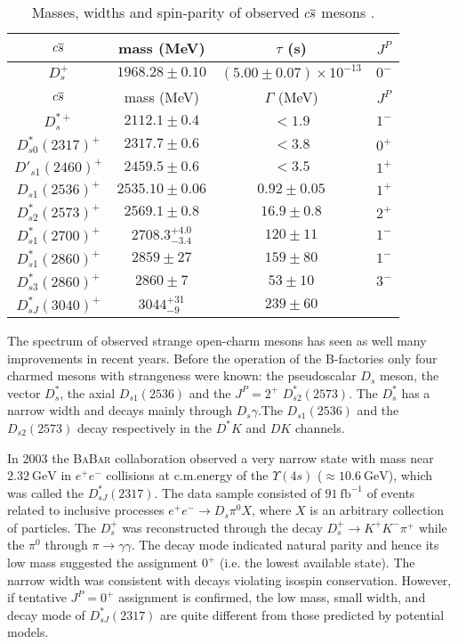 \begin{table}
  \centering
  \begin{tabular}{c c c c}
    \toprule
    $c \overline{s}$ & mass (MeV) & $\tau$ (s) & $J^P$ \\ 
    \midrule
    $D^+_s$ & $1968.28 \pm 0.10$ & $\left( 5.00 \pm 0.07 \right) \times 10^{-13}$ & $0^-$ \\
    \midrule[\heavyrulewidth]
    $c \overline{s}$ & mass (MeV) & $\Gamma$ (MeV) & $J^P$ \\ 
    \midrule
    $D^{* +}_s$ & $2112.1 \pm 0.4$ & $< 1.9$ & $1^-$ \\
    $D^*_{s0}(2317)^+$ & $2317.7 \pm 0.6$ & $<3.8$ & $0^+$ \\
    $D'_{s1}(2460)^+$ & $2459.5 \pm 0.6$ & $<3.5$ & $1^+$ \\
    $D_{s1}(2536)^+$ & $2535.10 \pm 0.06$ & $0.92 \pm 0.05$ & $1^+$ \\
    $D^*_{s2}(2573)^+$ & $2569.1 \pm 0.8$ & $16.9 \pm 0.8$ & $2^+$ \\
    $D^*_{s1}(2700)^+$ & $2708.3^{+4.0}_{-3.4}$ & $120 \pm 11$ & $1^-$ \\
    $D^*_{s1}(2860)^+$ & $2859 \pm 27$ & $159 \pm 80$ & $1^-$ \\
    $D^*_{s3}(2860)^+$ & $2860 \pm 7$ & $53 \pm 10$ & $3^-$ \\
    $D^*_{sJ}(3040)^+$ & $3044^{+31}_{-9}$ & $239 \pm 60$ & \\
    \bottomrule
  \end{tabular}
  \caption{Masses, widths and spin-parity of observed $c \overline{s}$ mesons \cite{Patrignani:2016xqp}.}
  \label{tab:Ds_mesons}
\end{table}

The spectrum of observed strange open-charm mesons has seen as well many improvements in recent years. Before the operation of the B-factories only four charmed mesons with strangeness were known: the pseudoscalar $D_s$ meson, the vector $D^*_s$, the axial $D_{s 1}(2536)$ and the $J^P = 2^+$ $D^*_{s 2}(2573)$. The $D^*_s$ has a narrow width and decays mainly through $D_s \gamma$.The $D_{s 1}(2536)$ and the $D_{s 2}(2573)$ decay respectively in the $D^* K$ and $D K$ channels.

In 2003 the \textsc{BaBar} collaboration observed a very narrow state with mass near $2.32 \ \text{GeV}$ \cite{Aubert:2003fg} in $e^+ e^-$ collisions at c.m.\@ energy of the $\varUpsilon(4 s)$ ($\approx 10.6 \ \text{GeV}$), which was called the $D^*_{sJ}(2317)$. The data sample consisted of $91 \ \text{fb}^{-1}$ of events related to inclusive processes $e^+ e^- \to D_s \pi^0 X$, where $X$ is an arbitrary collection of particles. The $D_s^+$ was reconstructed through the decay $D_s^+ \to K^+ K^- \pi^+$ while the $\pi^0$ through $\pi \to \gamma \gamma$. The decay mode indicated natural parity and hence its low mass suggested the assignment $0^+$ (i.e. the lowest available state). The narrow width was consistent with decays violating isospin conservation. However, if tentative $J^P = 0^+$ assignment is confirmed, the low mass, small width, and decay mode of $D^*_{sJ} (2317)$ are quite different from those predicted by potential models.

